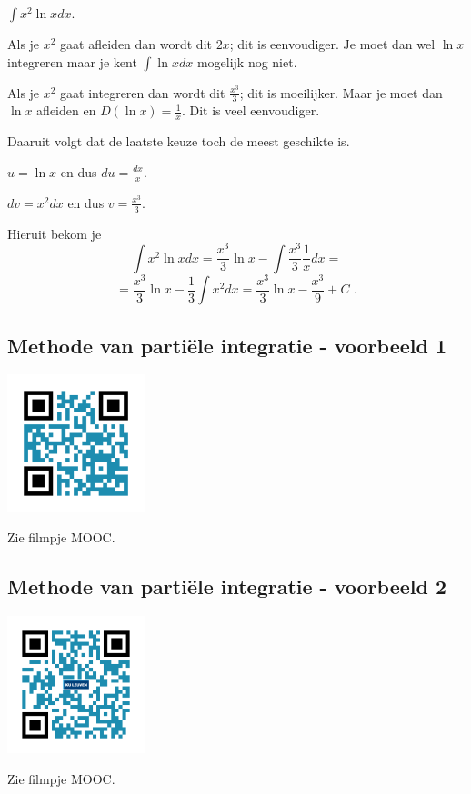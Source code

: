 \begin{voorbeeld}
	$\int x^2 \ln x dx$.

Als  je $x^2$ gaat afleiden dan wordt dit $2x$; dit is eenvoudiger. 
Je moet dan wel $\ln x$ integreren maar je kent $\int \ln x dx$ mogelijk nog niet.

Als je $x^2$ gaat integreren dan wordt dit $\frac{x^3}{3}$; dit is moeilijker.
Maar je moet dan $\ln x$ afleiden en $D (\ln x) = \frac{1}{x}$.
Dit is veel eenvoudiger.

Daaruit volgt dat de laatste keuze toch de meest geschikte is.

$u=\ln x$ en dus $du=\frac{dx}{x}$.

$dv=x^2dx$ en dus $v=\frac{x^3}{3}$.

Hieruit bekom je
\[
\int x^2 \ln x dx=\frac{x^3}{3} \ln x-\int \frac{x^3}{3}\frac{1}{x}dx=
\]
\[
=\frac{x^3}{3} \ln x-\frac{1}{3} \int x^2 dx=\frac{x^3}{3} \ln x -\frac{x^3}{9}+C \text { .}
\]

\end{voorbeeld}

\subsection{Methode van parti\"ele integratie - voorbeeld 1}
\begin{minipage}{.25\linewidth}
	\raggedright
	\includegraphics[width=4cm]{6_afgeleiden_integralen/inputs/QR_Code_PARTINTVB_module6_3}
\end{minipage}
\begin{minipage}{.7\linewidth}
	Zie filmpje MOOC.
\end{minipage}


\subsection{Methode van parti\"ele integratie - voorbeeld 2}
\begin{minipage}{.25\linewidth}
	\raggedright
	\includegraphics[width=4cm]{6_afgeleiden_integralen/inputs/QR_Code_PARTINTVB2_module6_3}
\end{minipage}
\begin{minipage}{.7\linewidth}
	Zie filmpje MOOC.
\end{minipage}


